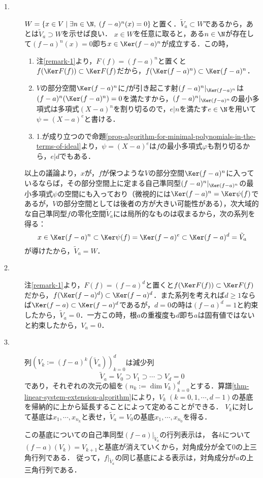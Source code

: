 \documentclass[uplatex, dvipdfmx]{jsreport}
\begin{document}
\begin{Proof}\mbox{}
    \begin{description}
        \item[1.] $W=\{x\in V\mid\exists n\in\N,\; (f-a)^n(x)=0\}$と置く．$\tilde{V}_a\subset W$であるから，あとは$\tilde{V}_a\supset W$を示せば良い．
        $x\in W$を任意に取ると，ある$n\in\N$が存在して$(f-a)^n(x)=0$即ち$x\in\Ker(f-a)^n$が成立する．この時，
        \begin{enumerate}[(1)]
            \item 注\ref{remark-1}より，$F(f)=(f-a)^n$と置くと$f(\Ker F(f))\subset\Ker F(f)$だから，$f(\Ker(f-a)^n)\subset\Ker(f-a)^n$．
            \item $V$の部分空間$\Ker(f-a)^n$に$f$が引き起こす射$(f-a)^n|_{\Ker(f-a)^n}$は$(f-a)^n(\Ker(f-a)^n)=0$を満たすから，$(f-a)^n|_{\Ker(f-a)^n}$の最小多項式は多項式$(X-a)^n$を割り切るので，$e|n$を満たす$e\in\N$を用いて$\psi=(X-a)^e$と書ける．
            \item 1.が成り立つので命題\ref{prop-algorithm-for-minimal-polynomials-in-the-terms-of-ideal}より，$\psi=(X-a)^e$は$f$の最小多項式$\varphi$も割り切るから，$e|d$でもある．
        \end{enumerate}
        以上の議論より，$x$が，$f$が保つような$V$の部分空間$\Ker(f-a)^n$に入っているならば，その部分空間上に定まる自己準同型$(f-a)^n|_{\Ker(f-a)^n}$の最小多項式$\psi$の空間にも入っており（微視的には$\Ker(f-a)^n=\Ker\psi(f)$であるが，$V$の部分空間としては後者の方が大きい可能性がある），次大域的な自己準同型$f$の零化空間$\tilde{V}_a$には局所的なものは収まるから，次の系列を得る：
        \[ x\in\Ker(f-a)^n\subset\Ker\psi(f)=\Ker(f-a)^e\subset\Ker(f-a)^d=\tilde{V}_a \]
        が導けたから，$\tilde{V}_a=W$．
        \item[2.] 注\ref{remark-1}より，$F(f)=(f-a)^d$と置くと$f(\Ker F(f))\subset\Ker F(f)$だから，$f(\Ker(f-a)^d)\subset\Ker(f-a)^d$．また系列を考えれば$d\ge 1$ならば$\Ker(f-a)\subset\Ker(f-a)^d$であるが，$d=0$の時は$(f-a)^d=1$と約束したから，$\tilde{V}_a=0$．一方この時，根$a$の重複度も$d$即ち$a$は固有値ではないと約束したから，$V_a=0$．
        \item[3.] 列$(V_k:=(f-a)^k(\tilde{V}_a))^d_{k=0}$は減少列
            \[\tilde{V}_a=V_0\supset V_1\supset\cdots\supset V_d=0\]
            であり，それぞれの次元の組を$(n_k:=\dim V_k)_{k=0}^d$とする．算譜\ref{thm-linear-system-extension-algorithm}により，$V_k\;(k=0,1,\cdots,d-1)$の基底を帰納的に上から延長することによって定めることができる．
            $V_k$に対して基底は$x_1,\cdots,x_{n_k}$と表せ，$\tilde{V}_a=V_0$の基底$x_1,\cdots,x_{n_0}$を得る．
            
            この基底についての自己準同型$(f-a)|_{\tilde{V}_a}$の行列表示は，
            各$k$について$(f-a)(V_k)=V_{k+1}$と基底が消えていくから，対角成分が全て$0$の上三角行列である．
            従って，$f|_{\tilde{V}_a}$の同じ基底による表示は，対角成分が$a$の上三角行列である．
    \end{description}
\end{Proof}
\end{document}
